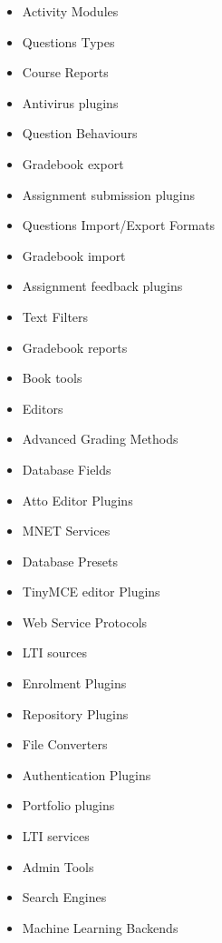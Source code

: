 \newcommand{\plugin}[2]{\item #1 }

\begin{itemize}
        \plugin{Activity Modules}{%
	  }

	\plugin{Questions Types}{%
	  }

	\plugin{Course Reports}{%
	  }

	\plugin{Antivirus plugins}{%
	  }

	\plugin{Question Behaviours}{%
	  }

	\plugin{Gradebook export}{%
	  }

	\plugin{Assignment submission plugins}{%
	  }

	\plugin{Questions Import/Export Formats}{%
	  }

	\plugin{Gradebook import}{%
	  }

	\plugin{Assignment feedback plugins}{%
	  }

	\plugin{Text Filters}{%
	  }

	\plugin{Gradebook reports}{%
	  }

	\plugin{Book tools}{%
	  }

	\plugin{Editors}{%
	  }

	\plugin{Advanced Grading Methods}{%
	  }

	\plugin{Database Fields}{%
	  }

	\plugin{Atto Editor Plugins}{%
	  }

	\plugin{MNET Services}{%
	  }

	\plugin{Database Presets}{%
	  }

	\plugin{TinyMCE editor Plugins}{%
	  }

	\plugin{Web Service Protocols}{%
	  }

	\plugin{LTI sources}{%
	  }

	\plugin{Enrolment Plugins}{%
	  }

	\plugin{Repository Plugins}{%
	  }

	\plugin{File Converters}{%
	  }

	\plugin{Authentication Plugins}{%
	  }

	\plugin{Portfolio plugins}{%
	  }

	\plugin{LTI services}{%
	  }

	\plugin{Admin Tools}{%
	  }

	\plugin{Search Engines}{%
	  }

	\plugin{Machine Learning Backends}{%
	  }


\end{itemize}
